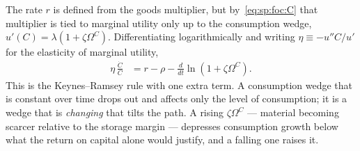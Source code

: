  The rate $r$ is defined from the goods multiplier, but by~\eqref{eq:sp:foc:C} that multiplier is tied to marginal utility only up to the consumption wedge, $u'\left(C\right)=\lambda\left(1+\zeta\Omega^C\right)$. Differentiating logarithmically and writing $\eta\equiv-u''C/u'$ for the elasticity of marginal utility,
\begin{align}
\eta\,\frac{\dot C}{C} &= r-\rho-\frac{d}{dt}\ln\left(1+\zeta\Omega^C\right).
\label{eq:sp:keynes-ramsey}
\end{align}
This is the Keynes--Ramsey rule with one extra term. A consumption wedge that is constant over time drops out and affects only the level of consumption; it is a wedge that is \emph{changing} that tilts the path. A rising $\zeta\Omega^C$ --- material becoming scarcer relative to the storage margin --- depresses consumption growth below what the return on capital alone would justify, and a falling one raises it.
